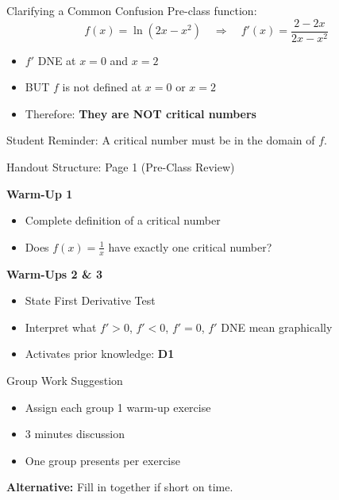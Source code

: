 \documentclass[dvipsnames]{beamer}
\begin{document}
\begin{frame}{Clarifying a Common Confusion}
Pre-class function:
\[
f(x)=\ln(2x-x^2)
\quad \Rightarrow \quad
f'(x)=\frac{2-2x}{2x-x^2}
\]

\vspace{0.5em}

\begin{itemize}
\item $f'$ DNE at $x=0$ and $x=2$
\item BUT $f$ is not defined at $x=0$ or $x=2$
\item Therefore: \textbf{They are NOT critical numbers}
\end{itemize}

\alert{Student Reminder: A critical number must be in the domain of $f$.}
\end{frame}

\begin{frame}{Handout Structure: Page 1 (Pre-Class Review)}

\textbf{\color{blue}Warm-Up 1}
\begin{itemize}
\item Complete definition of a critical number
\item Does $f(x)=\frac{1}{x}$ have exactly one critical number?
\end{itemize}

\vspace{0.5em}

\textbf{\color{blue}Warm-Ups 2 \& 3}
\begin{itemize}
\item State First Derivative Test
\item Interpret what $f' >0$, $f'<0$, $f'=0$, $f'$ DNE mean graphically
\item Activates prior knowledge: {\bf\color{ForestGreen} D1}
\end{itemize}
\end{frame}

\begin{frame}{Group Work Suggestion}
\begin{itemize}
\item Assign each group 1 warm-up exercise
\item 3 minutes discussion
\item One group presents per exercise
\end{itemize}



\textbf{Alternative:} Fill in together if short on time.
\end{frame}
\end{document}
